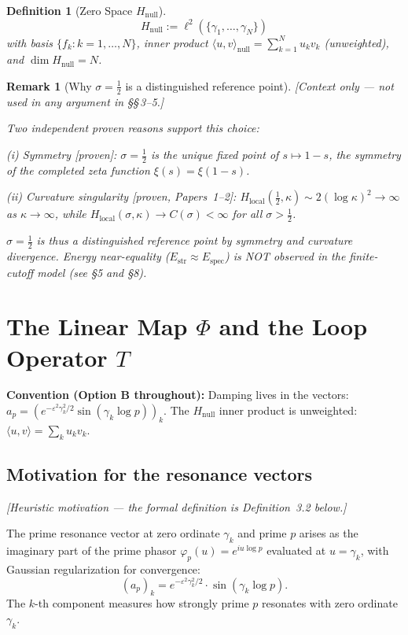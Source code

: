 \documentclass[11pt]{article}
\newtheorem{definition}[theorem]{Definition}
\newtheorem*{remark}{Remark}
\newcommand{\Hnull}{H_{\mathrm{null}}}
\newcommand{\Estr}{E_{\mathrm{str}}}
\newcommand{\Espec}{E_{\mathrm{spec}}}
\newcommand{\Hlocal}{H_{\mathrm{local}}}
\begin{document}
\begin{definition}[Zero Space $\Hnull$]
\[
\Hnull := \ell^2(\{\gamma_1,\ldots,\gamma_N\})
\]
with basis $\{f_k:k=1,\ldots,N\}$, inner product
$\langle u,v\rangle_{\mathrm{null}}=\sum_{k=1}^N u_k v_k$
(unweighted), and $\dim\Hnull=N$.
\end{definition}

\begin{remark}[Why $\sigma=\tfrac12$ is a distinguished reference point]
\label{rem:half}
\emph{[Context only --- not used in any argument in \S\S\,3--5.]}

Two independent proven reasons support this choice:

\emph{(i) Symmetry} [proven]: $\sigma=\tfrac12$ is the unique fixed point of
$s\mapsto 1-s$, the symmetry of the completed zeta function
$\xi(s)=\xi(1-s)$.

\emph{(ii) Curvature singularity} [proven, Papers~1--2]:
$\Hlocal(\tfrac12,\kappa)\sim 2(\log\kappa)^2\to\infty$ as $\kappa\to\infty$, %
while $\Hlocal(\sigma,\kappa)\to C(\sigma)<\infty$ for all $\sigma>\tfrac12$.

$\sigma=\tfrac12$ is thus a distinguished reference point by symmetry and
curvature divergence. Energy near-equality ($\Estr\approx\Espec$) is NOT
observed in the finite-cutoff model (see \S5 and \S8).
\end{remark}

\section{The Linear Map $\Phi$ and the Loop Operator $T$}

\textbf{Convention (Option B throughout):} Damping lives in the vectors:
$a_p=(e^{-\varepsilon^2\gamma_k^2/2}\sin(\gamma_k\log p))_k$.
The $\Hnull$ inner product is unweighted: $\langle u,v\rangle=\sum_k u_kv_k$.

\subsection{Motivation for the resonance vectors}

\emph{[Heuristic motivation --- the formal definition is Definition~3.2 below.]}

The prime resonance vector at zero ordinate $\gamma_k$ and prime $p$ arises as
the imaginary part of the prime phasor $\varphi_p(u)=e^{iu\log p}$ evaluated
at $u=\gamma_k$, with Gaussian regularization for convergence:
\[
(a_p)_k = e^{-\varepsilon^2\gamma_k^2/2}\cdot\sin(\gamma_k\log p).
\]
The $k$-th component measures how strongly prime $p$ resonates with zero
ordinate $\gamma_k$.
\end{document}
